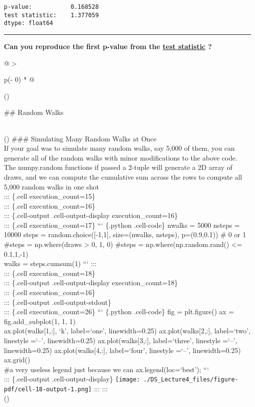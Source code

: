 \documentclass[
  letterpaper,
  DIV=11,
  numbers=noendperiod]{scrreprt}
\begin{document}
\begin{verbatim}
p-value:           0.168528
test statistic:    1.377059
dtype: float64
\end{verbatim}

\begin{center}\rule{0.5\linewidth}{0.5pt}\end{center}

\textbf{Can you reproduce the first p-value from the
\href{https://docs.scipy.org/doc/scipy/reference/generated/scipy.stats.t.html}{test
statistic} ?}

\begin{longtable}[]{@{}
  >{\raggedright\arraybackslash}p{(\columnwidth - 0\tabcolsep) * }@{}}
\toprule()
\begin{minipage}[b]{\linewidth}\raggedright
\#\# Random Walks
\end{minipage} \\
\midrule()
\endhead
\#\#\# Simulating Many Random Walks at Once \\
If your goal was to simulate many random walks, say 5,000 of them, you
can generate all of the random walks with minor modifications to the
above code. The numpy.random functions if passed a 2-tuple will generate
a 2D array of draws, and we can compute the cumulative sum across the
rows to compute all 5,000 random walks in one shot \\
::: \{.cell execution\_count=15\} \\
::: \{.cell execution\_count=16\} \\
::: \{.cell-output .cell-output-display execution\_count=16\} \\
::: \{.cell execution\_count=17\} ``` \{.python .cell-code\} nwalks =
5000 nsteps = 10000 steps = random.choice({[}-1,1{]}, size=(nwalks,
nsteps), p=(0.9,0.1)) \# 0 or 1 \#steps = np.where(draws \textgreater{}
0, 1, 0) \#steps = np.where(np.random.rand() \textless= 0.1,1,-1) \\
walks = steps.cumsum(1) ``` ::: \\
::: \{.cell execution\_count=18\} \\
::: \{.cell-output .cell-output-display execution\_count=18\} \\
::: \{.cell execution\_count=16\} \\
::: \{.cell-output .cell-output-stdout\} \\
::: \{.cell execution\_count=26\} ``` \{.python .cell-code\} fig =
plt.figure() ax = fig.add\_subplot(1, 1, 1) \\
ax.plot(walks{[}1,:{]}, `k', label=`one', linewidth=0.25)
ax.plot(walks{[}2,:{]}, label=`two', linestyle =`--', linewidth=0.25)
ax.plot(walks{[}3,:{]}, label=`three', linestyle =`--', linewidth=0.25)
ax.plot(walks{[}4,:{]}, label=`four', linestyle =`--', linewidth=0.25)
ax.grid() \\
\#a very useless legend just because we can ax.legend(loc=`best');
``` \\
::: \{.cell-output .cell-output-display\}
\texttt{[image: ./DS\_Lecture4\_files/figure-pdf/cell-18-output-1.png]}
::: ::: \\
\bottomrule()
\end{longtable}
\end{document}
